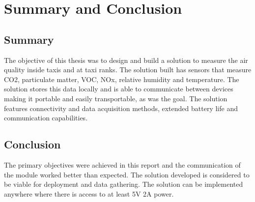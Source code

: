 \graphicspath{{conclusion/fig/}}

\chapter{Summary and Conclusion}
\label{chap:conclusion}
\vspace{-3em}
\section{Summary}

The objective of this thesis was to design and build a solution to measure the air quality inside taxis and at taxi ranks. The solution built has sensors that measure CO2, particulate matter, VOC, NOx, relative humidity and temperature. The solution stores this data locally and is able to communicate between devices making it portable and easily transportable, as was the goal. The solution features connectivity and data acquisition methods, extended battery life and communication capabilities.


\section{Conclusion}
\noindent
The primary objectives were achieved in this report and the communication of the module worked better than expected. The solution developed is considered to be viable for deployment and data gathering. The solution can be implemented anywhere where there is access to at least 5V 2A power.
